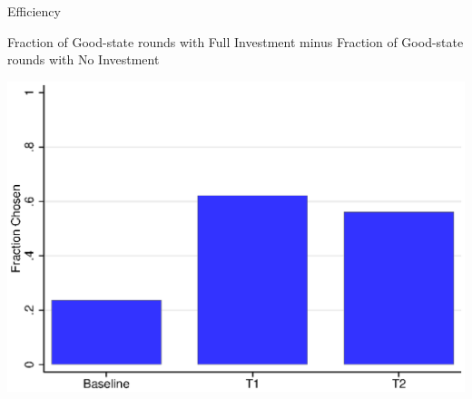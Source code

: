 \documentclass{beamer}
\begin{document}
\begin{frame}{Efficiency }
\begin{center}
Fraction of Good-state rounds with Full Investment minus Fraction
of Good-state rounds with No Investment
\par\end{center}

\begin{center}
\includegraphics[scale=0.6]{./i/E1_L5A.eps}
\par\end{center}
\end{frame}
\end{document}
